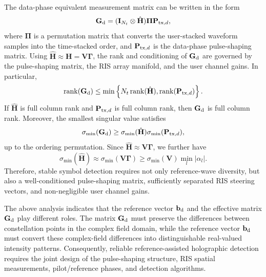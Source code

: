 \documentclass[journal]{IEEEtran}
\begin{document}
The data-phase equivalent measurement matrix can be written in the form
\begin{equation}
\mathbf{G}_{\rm d}
=
(\mathbf{I}_{N_t}\otimes\hat{\mathbf{H}})\boldsymbol{\Pi}\mathbf{P}_{{\rm tx},d},
\label{eq:Gd_composition}
\end{equation}
where $\boldsymbol{\Pi}$ is a permutation matrix that converts the user-stacked waveform samples into the time-stacked order, and $\mathbf{P}_{{\rm tx},d}$ is the data-phase pulse-shaping matrix. 
Using $\hat{\mathbf{H}}\approx\mathbf{H}=\mathbf{V}\boldsymbol{\Gamma}$, the rank and conditioning of $\mathbf{G}_{\rm d}$ are governed by the pulse-shaping matrix, the RIS array manifold, and the user channel gains. 
In particular,
\begin{equation}
\operatorname{rank}(\mathbf{G}_{\rm d})
\leq
\min\left\{
N_t\operatorname{rank}(\hat{\mathbf{H}}),
\operatorname{rank}(\mathbf{P}_{{\rm tx},d})
\right\}.
\label{eq:rank_Gd_upper_bound}
\end{equation}
If $\hat{\mathbf{H}}$ is full column rank and $\mathbf{P}_{{\rm tx},d}$ is full column rank, then $\mathbf{G}_{\rm d}$ is full column rank. 
Moreover, the smallest singular value satisfies
\begin{equation}
\sigma_{\min}(\mathbf{G}_{\rm d})
\geq
\sigma_{\min}(\hat{\mathbf{H}})
\sigma_{\min}(\mathbf{P}_{{\rm tx},d}),
\label{eq:sigma_min_Gd_bound}
\end{equation}
up to the ordering permutation. 
Since $\hat{\mathbf{H}}\approx\mathbf{V}\boldsymbol{\Gamma}$, we further have
\begin{equation}
\sigma_{\min}(\hat{\mathbf{H}})
\approx
\sigma_{\min}(\mathbf{V}\boldsymbol{\Gamma})
\geq
\sigma_{\min}(\mathbf{V})
\min_l |\alpha_l|.
\label{eq:sigma_min_H_bound}
\end{equation}
Therefore, stable symbol detection requires not only reference-wave diversity, but also a well-conditioned pulse-shaping matrix, sufficiently separated RIS steering vectors, and non-negligible user channel gains.

The above analysis indicates that the reference vector $\mathbf{b}_{\rm d}$ and the effective matrix $\mathbf{G}_{\rm d}$ play different roles. 
The matrix $\mathbf{G}_{\rm d}$ must preserve the differences between constellation points in the complex field domain, while the reference vector $\mathbf{b}_{\rm d}$ must convert these complex-field differences into distinguishable real-valued intensity patterns. 
Consequently, reliable reference-assisted holographic detection requires the joint design of the pulse-shaping structure, RIS spatial measurements, pilot/reference phases, and detection algorithms.
\end{document}
